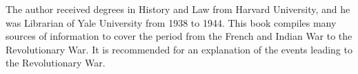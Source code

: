 
The author received degrees in History and Law from Harvard University, and he was
Librarian of Yale University from 1938 to 1944. This book compiles many sources
of information to cover the period from the French and Indian War to the
Revolutionary War. It is recommended for an explanation of the events leading to
the Revolutionary War.
